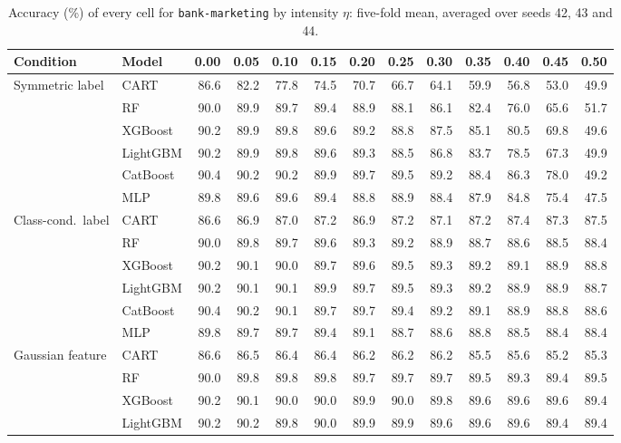 \documentclass[pdflatex,sn-mathphys]{sn-jnl}
\theoremstyle{thmstyleone}
\begin{document}
\begin{table}[htbp]
\centering
\tiny
\setlength{\tabcolsep}{2.6pt}
\caption{Accuracy (\%) of every cell for \texttt{bank-marketing} by intensity $\eta$: five-fold mean, averaged over seeds 42, 43 and 44.}
\label{tab:grid_bank_marketing}
\begin{tabular}{@{}llrrrrrrrrrrr@{}}
\toprule
Condition & Model & 0.00 & 0.05 & 0.10 & 0.15 & 0.20 & 0.25 & 0.30 & 0.35 & 0.40 & 0.45 & 0.50 \\
\midrule
Symmetric label & CART & 86.6 & 82.2 & 77.8 & 74.5 & 70.7 & 66.7 & 64.1 & 59.9 & 56.8 & 53.0 & 49.9 \\
 & RF & 90.0 & 89.9 & 89.7 & 89.4 & 88.9 & 88.1 & 86.1 & 82.4 & 76.0 & 65.6 & 51.7 \\
 & XGBoost & 90.2 & 89.9 & 89.8 & 89.6 & 89.2 & 88.8 & 87.5 & 85.1 & 80.5 & 69.8 & 49.6 \\
 & LightGBM & 90.2 & 89.9 & 89.8 & 89.6 & 89.3 & 88.5 & 86.8 & 83.7 & 78.5 & 67.3 & 49.9 \\
 & CatBoost & 90.4 & 90.2 & 90.2 & 89.9 & 89.7 & 89.5 & 89.2 & 88.4 & 86.3 & 78.0 & 49.2 \\
 & MLP & 89.8 & 89.6 & 89.6 & 89.4 & 88.8 & 88.9 & 88.4 & 87.9 & 84.8 & 75.4 & 47.5 \\
\midrule
Class-cond.\ label & CART & 86.6 & 86.9 & 87.0 & 87.2 & 86.9 & 87.2 & 87.1 & 87.2 & 87.4 & 87.3 & 87.5 \\
 & RF & 90.0 & 89.8 & 89.7 & 89.6 & 89.3 & 89.2 & 88.9 & 88.7 & 88.6 & 88.5 & 88.4 \\
 & XGBoost & 90.2 & 90.1 & 90.0 & 89.7 & 89.6 & 89.5 & 89.3 & 89.2 & 89.1 & 88.9 & 88.8 \\
 & LightGBM & 90.2 & 90.1 & 90.1 & 89.9 & 89.7 & 89.5 & 89.3 & 89.2 & 88.9 & 88.9 & 88.7 \\
 & CatBoost & 90.4 & 90.2 & 90.1 & 89.7 & 89.7 & 89.4 & 89.2 & 89.1 & 88.9 & 88.8 & 88.6 \\
 & MLP & 89.8 & 89.7 & 89.7 & 89.4 & 89.1 & 88.7 & 88.6 & 88.8 & 88.5 & 88.4 & 88.4 \\
\midrule
Gaussian feature & CART & 86.6 & 86.5 & 86.4 & 86.4 & 86.2 & 86.2 & 86.2 & 85.5 & 85.6 & 85.2 & 85.3 \\
 & RF & 90.0 & 89.8 & 89.8 & 89.8 & 89.7 & 89.7 & 89.7 & 89.5 & 89.3 & 89.4 & 89.5 \\
 & XGBoost & 90.2 & 90.1 & 90.0 & 90.0 & 89.9 & 90.0 & 89.8 & 89.6 & 89.6 & 89.6 & 89.4 \\
 & LightGBM & 90.2 & 90.2 & 89.8 & 90.0 & 89.9 & 89.9 & 89.6 & 89.6 & 89.6 & 89.4 & 89.4 \\

\end{tabular}
\end{table}
\end{document}
